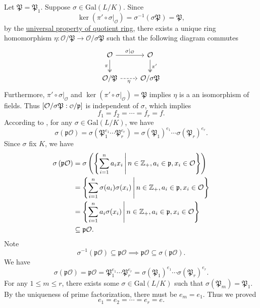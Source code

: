 \begin{prf}
    Let $\mathfrak{P}=\mathfrak{P}_1$. Suppose $\sigma \in \mathrm{Gal}(L/K)$. Since 
    \[
    \ker \left( \pi'\circ \sigma|_{\mathcal{O}}\right)=\sigma^{-1}(\sigma\mathfrak{P})=\mathfrak{P},
    \]
    by the \hyperref[th:universal_property_of_quotient_ring]{universal property of quotient ring}, there exists a unique ring homomorphism $\eta:\mathcal{O}/\mathfrak{P}\to \mathcal{O}/\sigma\mathfrak{P}$ such that the following diagram commutes
    \[
        \begin{tikzcd}
            \mathcal{O} \arrow[r, "\sigma|_{\mathcal{O}}"] \arrow[d, "\pi"', two heads] & \mathcal{O} \arrow[d, "\pi'", two heads] \\
            \mathcal{O}/\mathfrak{P} \arrow[r, "\eta"', dashed]                         & \mathcal{O}/\sigma\mathfrak{P}          
        \end{tikzcd}
    \]
    Furthermore, $\pi'\circ \sigma|_{\mathcal{O}}$ and $\ker \left( \pi'\circ \sigma|_{\mathcal{O}}\right)=\mathfrak{P}$ implies $\eta$ is a an isomorphism of fields. Thus $[\mathcal{O}/\sigma\mathfrak{P}:\mathcalo/\mathfrak{p}]$ is independent of $\sigma$, which implies 
    \[
    f_1=f_2=\cdots=f_r=f.
    \]
    According to , for any $\sigma\in \mathrm{Gal}(L/K)$, we have
    \[
    \sigma\left(\mathfrak{p}\mathcal{O}\right)=\sigma\left(\mathfrak{P}_1^{e_1}\cdots\mathfrak{P}_r^{e_r}\right)=\sigma\left(\mathfrak{P}_1\right)^{e_1}\cdots\sigma\left(\mathfrak{P}_r\right)^{e_r}.
    \]
    Since $\sigma$ fix $K$, we have
    \begin{align*}
        \sigma\left(\mathfrak{p}\mathcal{O}\right)&=\sigma\left(\left\{ \sum_{i=1}^n a_ix_i \,\middle\vert\, n\in\mathbb{Z}_+,a_i\in \mathfrak{p}, x_i\in \mathcal{O}\right\}\right)\\
        &=\left\{ \sum_{i=1}^n \sigma(a_i)\sigma(x_i) \,\middle\vert\, n\in\mathbb{Z}_+,a_i\in \mathfrak{p}, x_i\in \mathcal{O}\right\}\\
        &=\left\{ \sum_{i=1}^n a_i\sigma(x_i) \,\middle\vert\, n\in\mathbb{Z}_+,a_i\in \mathfrak{p}, x_i\in \mathcal{O}\right\}\\
        &\subseteq \mathfrak{p}\mathcal{O}.
    \end{align*}
    Note 
    \[
    \sigma^{-1}\left(\mathfrak{p}\mathcal{O}\right)\subseteq \mathfrak{p}\mathcal{O}\implies \mathfrak{p}\mathcal{O}\subseteq \sigma\left(\mathfrak{p}\mathcal{O}\right).
    \]
    We have 
    \[
    \sigma\left(\mathfrak{p}\mathcal{O}\right)=\mathfrak{p}\mathcal{O}= \mathfrak{P}_1^{e_1}\cdots\mathfrak{P}_r^{e_r}=\sigma\left(\mathfrak{P}_1\right)^{e_1}\cdots\sigma\left(\mathfrak{P}_r\right)^{e_r}.
    \]
    For any $1\le m\le r$, there exists some $\sigma \in \mathrm{Gal}(L/K)$ such that $\sigma\left(\mathfrak{P}_m\right)=\mathfrak{P}_1$. By the uniqueness of prime factorization, there must be $e_m=e_1$. Thus we proved
    \[
    e_1=e_2=\cdots=e_r=e.
    \]
\end{prf}

